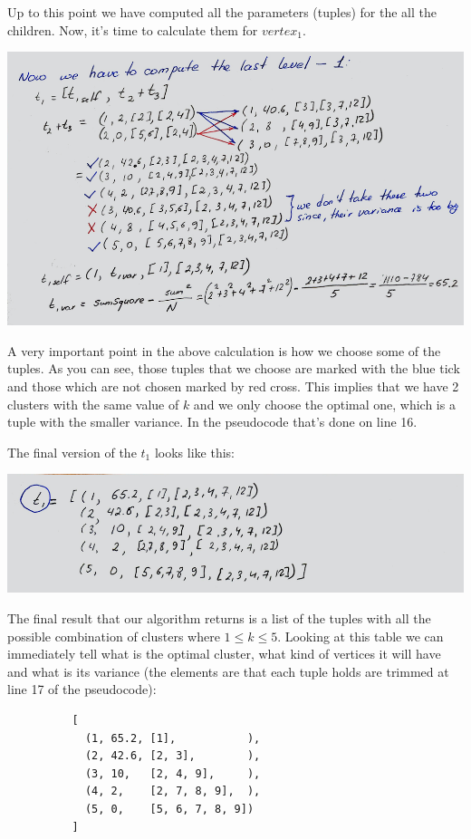 \documentclass[11pt,a4paper,english]{article}
\begin{document}
        Up to this point we have computed all the parameters (tuples) for the all the children. Now, it's time to calculate them for $vertex_1$.
        \begin{center}
          \includegraphics[width=15cm]{sc_6.png}
        \end{center}
        A very important point in the above calculation is how we choose some of the tuples. As you can see, those tuples that we choose are marked with the blue tick and those which are not chosen marked by red cross. This implies that we have 2 clusters with the same value of $k$ and we only choose the optimal one, which is a tuple with the smaller variance. In the pseudocode that's done on line 16.

        The final version of the $t_1$ looks like this:
        \begin{center}
          \includegraphics[width=15cm]{sc_7.png}
        \end{center}

        The final result that our algorithm returns is a list of the tuples with all the possible combination of clusters where $1 \leq k \leq 5$. Looking at this table we can immediately tell what is the optimal cluster, what kind of vertices it will have and what is its variance (the elements are that each tuple holds are trimmed at line 17 of the pseudocode):
        \begin{verbatim}
          [
            (1, 65.2, [1],           ),
            (2, 42.6, [2, 3],        ),
            (3, 10,   [2, 4, 9],     ),
            (4, 2,    [2, 7, 8, 9],  ),
            (5, 0,    [5, 6, 7, 8, 9])
          ]
        \end{verbatim}
\end{document}
